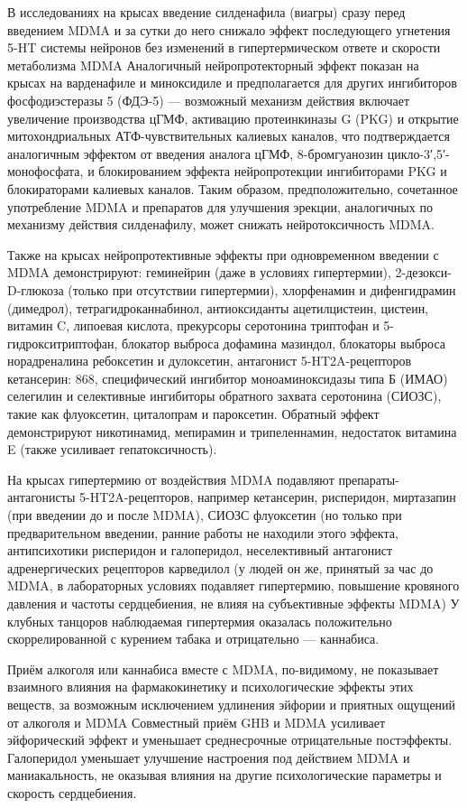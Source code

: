 \documentclass[a4paper,14pt,russian]{report}
\begin{document}
В исследованиях на крысах введение силденафила (виагры) сразу перед введением MDMA и за сутки до него снижало эффект последующего угнетения 5-HT системы нейронов без изменений в гипертермическом ответе и скорости метаболизма MDMA Аналогичный нейропротекторный эффект показан на крысах на варденафиле и миноксидиле и предполагается для других ингибиторов фосфодиэстеразы 5 (ФДЭ-5) — возможный механизм действия включает увеличение производства цГМФ, активацию протеинкиназы G (PKG) и открытие митохондриальных АТФ-чувствительных калиевых каналов, что подтверждается аналогичным эффектом от введения аналога цГМФ, 8-бромгуанозин цикло-3′,5′-монофосфата, и блокированием эффекта нейропротекции ингибиторами PKG и блокираторами калиевых каналов. Таким образом, предположительно, сочетанное употребление MDMA и препаратов для улучшения эрекции, аналогичных по механизму действия силденафилу, может снижать нейротоксичность MDMA.

Также на крысах нейропротективные эффекты при одновременном введении с MDMA демонстрируют: геминейрин (даже в условиях гипертермии), 2-дезокси-D-глюкоза (только при отсутствии гипертермии), хлорфенамин и дифенгидрамин (димедрол), тетрагидроканнабинол, антиоксиданты ацетилцистеин, цистеин, витамин C, липоевая кислота, прекурсоры серотонина триптофан и 5-гидрокситриптофан, блокатор выброса дофамина мазиндол, блокаторы выброса норадреналина ребоксетин и дулоксетин, антагонист 5-HT2A-рецепторов кетансерин: 868, специфический ингибитор моноаминоксидазы типа Б (ИМАО) селегилин и селективные ингибиторы обратного захвата серотонина (СИОЗС), такие как флуоксетин, циталопрам и пароксетин. Обратный эффект демонстрируют никотинамид, мепирамин и трипеленнамин, недостаток витамина E (также усиливает гепатоксичность).

На крысах гипертермию от воздействия MDMA подавляют препараты-антагонисты 5-HT2A-рецепторов, например кетансерин, рисперидон, миртазапин (при введении до и после MDMA), СИОЗС флуоксетин (но только при предварительном введении, ранние работы не находили этого эффекта, антипсихотики рисперидон и галоперидол, неселективный антагонист адренергических рецепторов карведилол (у людей он же, принятый за час до MDMA, в лабораторных условиях подавляет гипертермию, повышение кровяного давления и частоты сердцебиения, не влияя на субъективные эффекты MDMA) У клубных танцоров наблюдаемая гипертермия оказалась положительно скоррелированной с курением табака и отрицательно — каннабиса.

Приём алкоголя или каннабиса вместе с MDMA, по-видимому, не показывает взаимного влияния на фармакокинетику и психологические эффекты этих веществ, за возможным исключением удлинения эйфории и приятных ощущений от алкоголя и MDMA Совместный приём GHB и MDMA усиливает эйфорический эффект и уменьшает среднесрочные отрицательные постэффекты. Галоперидол уменьшает улучшение настроения под действием MDMA и маниакальность, не оказывая влияния на другие психологические параметры и скорость сердцебиения.
\end{document}
